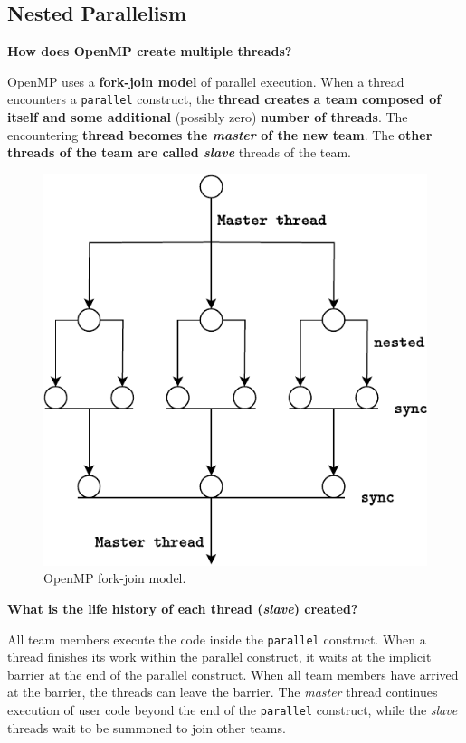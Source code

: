 \subsection{Nested Parallelism}

\begin{flushleft}
    \textcolor{Green3}{ \textbf{How does OpenMP create multiple threads?}}
\end{flushleft}
OpenMP uses a \textbf{fork-join model} of parallel execution. When a thread encounters a \texttt{parallel} construct, the \textbf{thread creates a team composed of itself and some additional} (possibly zero) \textbf{number of threads}. The encountering \textbf{thread becomes the \emph{master} of the new team}. The \textbf{other threads of the team are called \emph{slave}} threads of the team.

\begin{figure}[!htp]
    \centering
    \includegraphics[width=.6\textwidth]{img/openmp-fork-join-1.pdf}
    \caption{OpenMP fork-join model.}
\end{figure}

\begin{flushleft}
    \textcolor{Green3}{ \textbf{What is the life history of each thread (\emph{slave}) created?}}
\end{flushleft}
All team members execute the code inside the \texttt{parallel} construct. When a thread finishes its work within the parallel construct, it waits at the implicit barrier at the end of the parallel construct. When all team members have arrived at the barrier, the threads can leave the barrier. The \emph{master} thread continues execution of user code beyond the end of the \texttt{parallel} construct, while the \emph{slave} threads wait to be summoned to join other teams.

